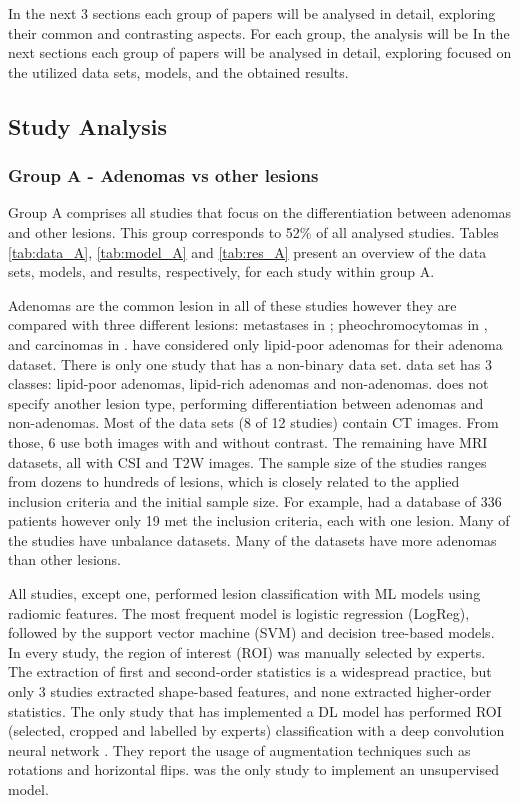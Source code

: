 \documentclass{article}
\begin{document}
In the next 3 sections each group of papers will be analysed in detail,
exploring their common and contrasting aspects. For each group, the analysis
will be In the next sections each group of papers will be analysed in detail,
exploring focused on the utilized data sets, models, and the obtained results.

\subsection{Study Analysis}

\subsubsection{Group A - Adenomas vs other lesions}

Group A comprises all studies that focus on the differentiation between adenomas
and other lesions. This group corresponds to 52\% of all analysed studies.
Tables \ref{tab:data_A}, \ref{tab:model_A} and \ref{tab:res_A} present an
overview of the data sets, models, and results, respectively, for each study
within group A.

Adenomas are the common lesion in all of these studies however
they are compared with three different lesions: metastases in
\cite{Schieda2017,Tu2018,Tu2020}; pheochromocytomas in \cite{Yi20181,Yi2018,
    Liu2022,Liu2021}, and carcinomas in \cite{Elmohr2019, Torresan2021, Ho2019}.
\cite{Tu2020, Yi2018, Yi20181, Liu2022} have considered only lipid-poor adenomas
for their adenoma dataset. There is only one study that has a non-binary data
set. \cite{Romeo2018} data set has 3 classes: lipid-poor adenomas, lipid-rich
adenomas and non-adenomas. \cite{Kusunoki2022} does not specify another lesion
type, performing differentiation between adenomas and non-adenomas. Most of the
data sets (8 of 12 studies) contain CT images. From those, 6 use both images
with and without contrast. The remaining have MRI datasets, all with CSI and T2W
images. The sample size of the studies ranges from dozens to hundreds of
lesions, which is closely related to the applied inclusion criteria and the
initial sample size. For example, \cite{Torresan2021} had a database of 336
patients however only 19 met the inclusion criteria, each with one lesion. Many
of the studies have unbalance datasets. Many of the datasets have more adenomas
than other lesions.

All studies, except one, performed lesion classification
with ML models using radiomic features. The most frequent model is logistic
regression (LogReg), followed by the support vector machine (SVM) and decision
tree-based models. In every study, the region of interest (ROI) was manually
selected by experts. The extraction of first and second-order statistics is a
widespread practice, but only 3 studies extracted shape-based features, and none
extracted higher-order statistics. The only study that has implemented a DL
model has performed ROI (selected, cropped and labelled by experts)
classification with a deep convolution neural network \cite{Kusunoki2022}. They
report the usage of augmentation techniques such as rotations and horizontal
flips. \cite{Torresan2021} was the only study to implement an unsupervised
model.
\end{document}
